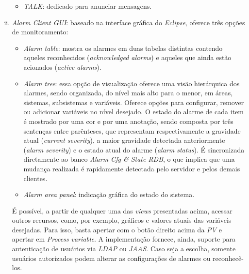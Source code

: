 \begin{enumerate}[i.]
\begin{itemize}
    \item \textit{TALK}: dedicado para anunciar mensagens.
    
  \end{itemize}
  
  \item \textit{Alarm Client GUI}: \label{client-gui} baseado na interface
  gráfica do \textit{Eclipse}, oferece três opções de monitoramento:
  
  \begin{itemize} \renewcommand\labelitemi{--}
    \item \textit{Alarm table}: mostra os alarmes em duas tabelas distintas
    contendo aqueles reconhecidos (\textit{acknowledged alarms}) e aqueles que
    ainda estão acionados (\textit{active alarms}).
    
    \item \textit{Alarm tree}: essa opção de visualização oferece
    uma visão hierárquica dos alarmes, sendo organizada, do nível mais alto para
    o menor, em áreas, sistemas, subsistemas e variáveis. Oferece opções para
    configurar, remover ou adicionar variáveis no nível desejado. O estado do
    alarme de cada item é mostrado por uma cor e por uma anotação, sendo
    composta por três sentenças entre parênteses, que representam
    respectivamente a gravidade atual (\textit{current severity}), a
    maior gravidade detectada anteriormente (\textit{alarm severity}) e o estado
    atual do alarme (\textit{alarm status}). É sincronizada diretamente ao banco
    \textit{Alarm Cfg \& State RDB}, o que implica que uma mudança realizada é
    rapidamente detectada pelo servidor e pelos demais clientes.
    
    \item \textit{Alarm area panel}: indicação gráfica do estado do sistema.
    
  \end{itemize}
  
  É possível, a partir de qualquer uma das \textit{views} presentadas acima,
  acessar outros recursos, como, por exemplo, gráficos e valores atuais das
  variáveis desejadas. Para isso, basta apertar com o botão direito acima da
  \textit{PV} e apertar em \textit{Process variable}. A implementação fornece,
  ainda, suporte para autenticação de usuários via \textit{LDAP} ou
  \textit{JAAS}. Caso seja a escolha, somente usuários autorizados podem alterar
  as configurações de alarmes ou reconhecê-los.
  
\end{enumerate}

